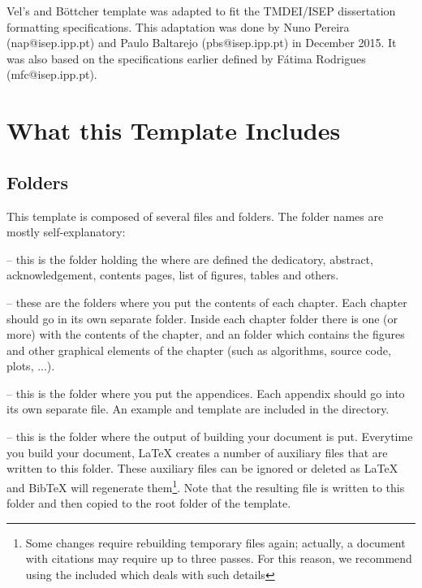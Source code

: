 Vel's and Böttcher template was adapted to fit the TMDEI/ISEP dissertation formatting specifications. This adaptation was done by Nuno Pereira (nap@isep.ipp.pt) and Paulo Baltarejo (pbs@isep.ipp.pt) in December 2015. It was also based on the specifications earlier defined by Fátima Rodrigues (mfc@isep.ipp.pt).

\section{What this Template Includes}

\subsection{Folders}

This template is composed of several files and folders. The folder names are mostly self-explanatory:

 -- this is the folder holding the  where are defined the dedicatory, abstract, acknowledgement, contents pages, list of figures, tables and others.

 -- these are the folders where you put the contents of each chapter. Each chapter should go in its own separate folder. Inside each chapter folder there is one (or more)  with the contents of the chapter, and an  folder which contains the figures and other graphical elements of the chapter (such as algorithms, source code, plots, ...).

 -- this is the folder where you put the appendices. Each appendix should go into its own separate  file. An example and template are included in the directory.

 -- this is the folder where the output of building your document is put. Everytime you build your document,
 \LaTeX{} creates a number of auxiliary files that are written to this folder. These auxiliary files can be ignored or deleted as \LaTeX{} and BibTeX will regenerate them\footnote{Some changes require rebuilding temporary files again; actually, a document with citations may require up to three passes. For this reason, we recommend using the included  which deals with such details}. Note that the resulting  file is written to this folder and then copied to the root folder of the template.

